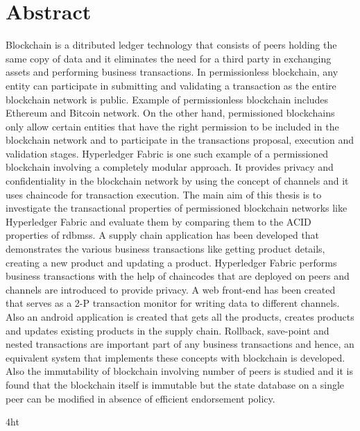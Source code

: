 \documentclass[
  a4paper,  %
  twoside,  %
  bibliography=totoc,
  headsepline,
  cleardoublepage=empty,
  parskip=half,
  draft=false
]{scrbook}
\begin{document}
  \section*{Abstract}
\fi
Blockchain is a ditributed ledger technology that consists of peers holding the same copy of data and it eliminates the need for a third party in exchanging assets and performing business transactions. In permissionless blockchain, any entity can participate in submitting and validating a transaction as the entire blockchain network is public. Example of permissionless blockchain includes Ethereum and Bitcoin network. On the other hand, permissioned blockchains only allow certain entities that have the right permission to be included in the blockchain network and to participate in the transactions proposal, execution and validation stages. Hyperledger Fabric is one such example of a permissioned blockchain involving a completely modular approach. It provides privacy and confidentiality in the blockchain network by using the concept of channels and it uses chaincode for transaction execution. \linebreak \linebreak
The main aim of this thesis is to investigate the transactional properties of permissioned blockchain networks like
Hyperledger Fabric and evaluate them by comparing them to the ACID properties of \glspl{rdbms}. A supply chain application has been developed that demonstrates the various business transactions like getting product details, creating a new product and updating a product. Hyperledger Fabric performs business transactions with the help of chaincodes that are deployed on peers and channels are introduced to provide privacy. A web front-end has been created that serves as a 2-P transaction monitor for writing data to different channels. Also an android application is created that gets all the products, creates products and updates existing products in the supply chain. Rollback, save-point and nested transactions are important part of any business transactions and hence, an equivalent system that implements these concepts with blockchain is developed. Also the immutability of blockchain involving number of peers is studied and it is found that the blockchain itself is immutable but the state database on a single peer can be modified in absence of efficient endorsement policy. 

\cleardoublepage



\iftex4ht
\else
\fi
\end{document}
